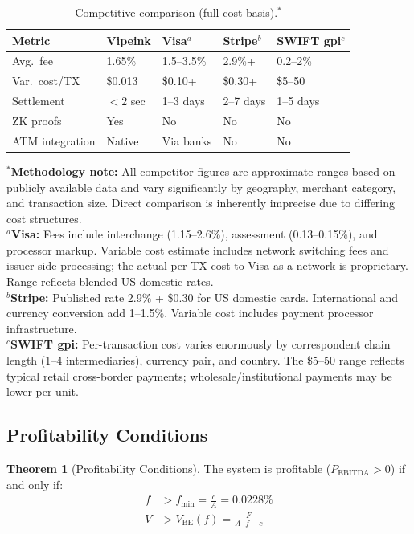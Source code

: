 \documentclass[12pt,a4paper]{article}
\theoremstyle{definition}
\newtheorem{theorem}{Theorem}[section]
\theoremstyle{remark}
\newcommand{\USD}[1]{\$#1}
\DeclareMathOperator{\EBITDA}{EBITDA}
\begin{document}
\begin{table}[H]
\centering
\caption{Competitive comparison (full-cost basis).$^{*}$}
\label{tab:competitive}
\begin{tabular}{L{2.5cm}R{2cm}R{2cm}R{2cm}R{2.5cm}}
\toprule
\textbf{Metric} & \textbf{Vipeink} & \textbf{Visa}$^{a}$ & \textbf{Stripe}$^{b}$ & \textbf{SWIFT gpi}$^{c}$ \\
\midrule
Avg.\ fee & 1.65\% & 1.5--3.5\% & 2.9\%+ & 0.2--2\% \\
Var.\ cost/TX & \USD{0.013} & \USD{0.10+} & \USD{0.30+} & \USD{5--50} \\
Settlement & $< 2$ sec & 1--3 days & 2--7 days & 1--5 days \\
ZK proofs & Yes & No & No & No \\
ATM integration & Native & Via banks & No & No \\
\bottomrule
\end{tabular}

\vspace{4pt}
{\scriptsize
$^{*}$\textbf{Methodology note:} All competitor figures are approximate ranges based on publicly available data and vary significantly by geography, merchant category, and transaction size. Direct comparison is inherently imprecise due to differing cost structures.\\
$^{a}$\textbf{Visa:} Fees include interchange (1.15--2.6\%), assessment (0.13--0.15\%), and processor markup. Variable cost estimate includes network switching fees and issuer-side processing; the actual per-TX cost to Visa as a network is proprietary. Range reflects blended US domestic rates.\\
$^{b}$\textbf{Stripe:} Published rate 2.9\% + \$0.30 for US domestic cards. International and currency conversion add 1--1.5\%. Variable cost includes payment processor infrastructure.\\
$^{c}$\textbf{SWIFT gpi:} Per-transaction cost varies enormously by correspondent chain length (1--4 intermediaries), currency pair, and country. The \$5--50 range reflects typical retail cross-border payments; wholesale/institutional payments may be lower per unit.
\par}
\end{table}

\subsection{Profitability Conditions}

\begin{theorem}[Profitability Conditions]
\label{thm:profitability}
The system is profitable ($P_{\EBITDA} > 0$) if and only if:
\begin{align}
f &> f_{\min} = \frac{c}{A} = 0.0228\% \\
V &> V_{\text{BE}}(f) = \frac{F}{A \cdot f - c}
\end{align}
\end{theorem}
\end{document}
